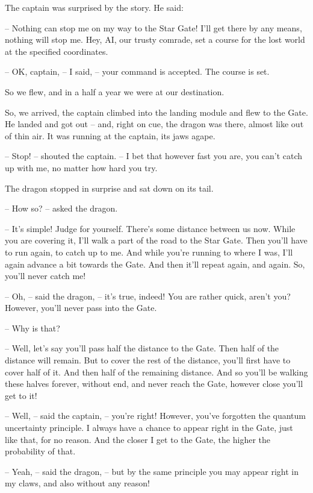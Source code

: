 \documentclass[ebook,oneside,final,openright]{memoir}
\begin{document}
\par
The captain was surprised by the story. He said:\par
– Nothing can stop me on my way to the Star Gate! I’ll get there by any means, nothing will stop me. Hey, AI, our trusty comrade, set a course for the lost world at the specified coordinates.\par
– OK, captain, – I said, – your command is accepted. The course is set.\par
So we flew, and in a half a year we were at our destination.\par
\par
So, we arrived, the captain climbed into the landing module and flew to the Gate. He landed and got out – and, right on cue, the dragon was there, almost like out of thin air. It was running at the captain, its jaws agape.\par
– Stop! – shouted the captain. – I bet that however fast you are, you can’t catch up with me, no matter how hard you try.\par
The dragon stopped in surprise and sat down on its tail.\par
– How so? – asked the dragon.\par
– It’s simple! Judge for yourself. There’s some distance between us now. While you are covering it, I’ll walk a part of the road to the Star Gate. Then you’ll have to run again, to catch up to me. And while you’re running to where I was, I’ll again advance a bit towards the Gate. And then it’ll repeat again, and again. So, you’ll never catch me!\par
– Oh, – said the dragon, – it’s true, indeed! You are rather quick, aren’t you? However, you’ll never pass into the Gate.\par
– Why is that?\par
– Well, let’s say you’ll pass half the distance to the Gate. Then half of the distance will remain. But to cover the rest of the distance, you’ll first have to cover half of it. And then half of the remaining distance. And so you’ll be walking these halves forever, without end, and never reach the Gate, however close you’ll get to it!\par
– Well, – said the captain, – you’re right! However, you’ve forgotten the quantum uncertainty principle. I always have a chance to appear right in the Gate, just like that, for no reason. And the closer I get to the Gate, the higher the probability of that.\par
– Yeah, – said the dragon, – but by the same principle you may appear right in my claws, and also without any reason!\par
\end{document}
